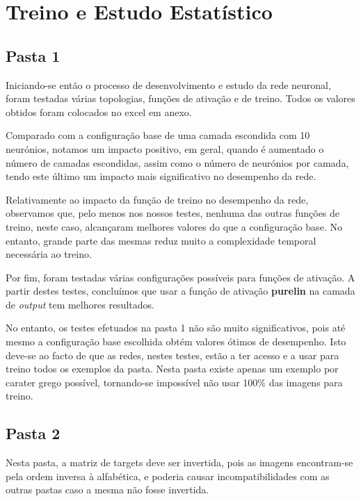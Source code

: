 \documentclass[11pt]{article}
\begin{document}
	\pagebreak
	
	\large
	\section{Treino e Estudo Estatístico}
	\subsection{Pasta 1}
	\normalsize
	
	Iniciando-se então o processo de desenvolvimento e estudo da rede neuronal, foram testadas várias topologias, funções de ativação e de treino. Todos os valores obtidos foram colocados no excel em anexo.
	
	Comparado com a configuração base de uma camada escondida com 10 neurónios, notamos um impacto positivo, em geral, quando é aumentado o número de camadas escondidas, assim como o número de neurónios por camada, tendo este último um impacto mais significativo no desempenho da rede.
	
	Relativamente ao impacto da função de treino no desempenho da rede, observamos que, pelo menos nos nossos testes, nenhuma das outras funções de treino, neste caso, alcançaram melhores valores do que a configuração base. No entanto, grande parte das mesmas reduz muito a complexidade temporal necessária ao treino.
	
	Por fim, foram testadas várias configurações possíveis para funções de ativação. A partir destes testes, concluímos que usar a função de ativação \textbf{purelin} na camada de \textit{output} tem melhores resultados.
	
	No entanto, os testes efetuados na pasta 1 não são muito significativos, pois até mesmo a configuração base escolhida obtém valores ótimos de desempenho. Isto deve-se ao facto de que as redes, nestes testes, estão a ter acesso e a usar para treino todos os exemplos da pasta. Nesta pasta existe apenas um exemplo por carater grego possível, tornando-se impossível não usar 100\% das imagens para treino.
	
	\pagebreak
	
	
	\large
	\subsection{Pasta 2}
	\normalsize
	
	Nesta pasta, a matriz de targets deve ser invertida, pois as imagens encontram-se pela ordem inversa à alfabética, e poderia causar incompatibilidades com as outras pastas caso a mesma não fosse invertida.
	
\end{document}
